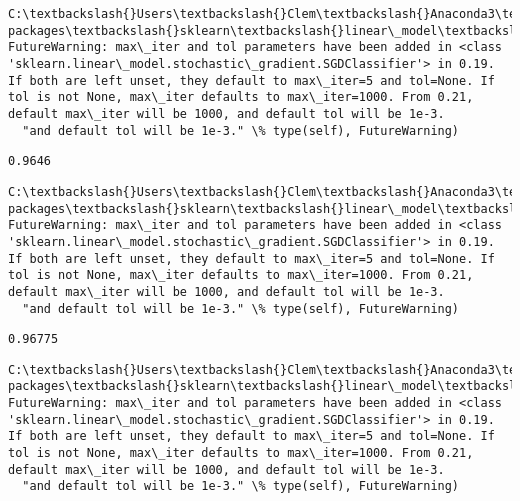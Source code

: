 \documentclass[11pt]{article}
\begin{document}
    \begin{Verbatim}[commandchars=\\\{\}]
C:\textbackslash{}Users\textbackslash{}Clem\textbackslash{}Anaconda3\textbackslash{}lib\textbackslash{}site-packages\textbackslash{}sklearn\textbackslash{}linear\_model\textbackslash{}stochastic\_gradient.py:128: FutureWarning: max\_iter and tol parameters have been added in <class 'sklearn.linear\_model.stochastic\_gradient.SGDClassifier'> in 0.19. If both are left unset, they default to max\_iter=5 and tol=None. If tol is not None, max\_iter defaults to max\_iter=1000. From 0.21, default max\_iter will be 1000, and default tol will be 1e-3.
  "and default tol will be 1e-3." \% type(self), FutureWarning)

    \end{Verbatim}

    \begin{Verbatim}[commandchars=\\\{\}]
0.9646

    \end{Verbatim}

    \begin{Verbatim}[commandchars=\\\{\}]
C:\textbackslash{}Users\textbackslash{}Clem\textbackslash{}Anaconda3\textbackslash{}lib\textbackslash{}site-packages\textbackslash{}sklearn\textbackslash{}linear\_model\textbackslash{}stochastic\_gradient.py:128: FutureWarning: max\_iter and tol parameters have been added in <class 'sklearn.linear\_model.stochastic\_gradient.SGDClassifier'> in 0.19. If both are left unset, they default to max\_iter=5 and tol=None. If tol is not None, max\_iter defaults to max\_iter=1000. From 0.21, default max\_iter will be 1000, and default tol will be 1e-3.
  "and default tol will be 1e-3." \% type(self), FutureWarning)

    \end{Verbatim}

    \begin{Verbatim}[commandchars=\\\{\}]
0.96775

    \end{Verbatim}

    \begin{Verbatim}[commandchars=\\\{\}]
C:\textbackslash{}Users\textbackslash{}Clem\textbackslash{}Anaconda3\textbackslash{}lib\textbackslash{}site-packages\textbackslash{}sklearn\textbackslash{}linear\_model\textbackslash{}stochastic\_gradient.py:128: FutureWarning: max\_iter and tol parameters have been added in <class 'sklearn.linear\_model.stochastic\_gradient.SGDClassifier'> in 0.19. If both are left unset, they default to max\_iter=5 and tol=None. If tol is not None, max\_iter defaults to max\_iter=1000. From 0.21, default max\_iter will be 1000, and default tol will be 1e-3.
  "and default tol will be 1e-3." \% type(self), FutureWarning)

    \end{Verbatim}
\end{document}
